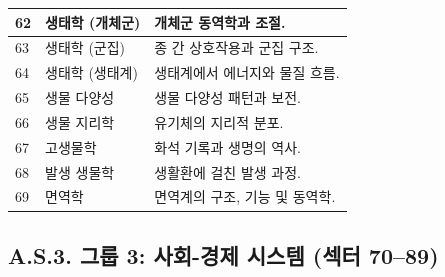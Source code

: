 \documentclass[13pt,a4paper]{article}
\begin{document}
\begin{longtable}{|p{0.9cm}|p{6.0cm}|p{8.6cm}|}
		62 & 생태학 (개체군) & 개체군 동역학과 조절. \\
		\hline
		63 & 생태학 (군집) & 종 간 상호작용과 군집 구조. \\
		\hline
		64 & 생태학 (생태계) & 생태계에서 에너지와 물질 흐름. \\
		\hline
		65 & 생물 다양성 & 생물 다양성 패턴과 보전. \\
		\hline
		66 & 생물 지리학 & 유기체의 지리적 분포. \\
		\hline
		67 & 고생물학 & 화석 기록과 생명의 역사. \\
		\hline
		68 & 발생 생물학 & 생활환에 걸친 발생 과정. \\
		\hline
		69 & 면역학 & 면역계의 구조, 기능 및 동역학. \\
		\hline
	\end{longtable}
	
	\subsection*{A.S.3. 그룹 3: 사회-경제 시스템 (섹터 70--89)}
	
\end{document}
